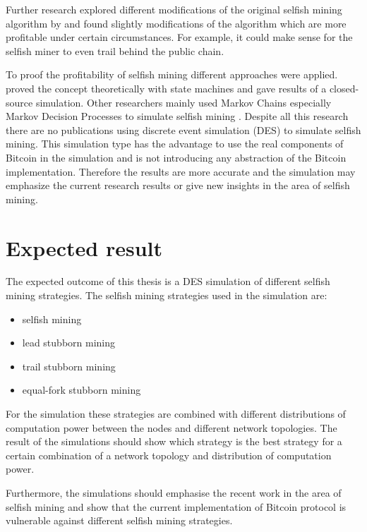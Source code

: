 \documentclass{scrartcl}
\begin{document}
Further research \cite{nayak2016stubborn,sapirshtein2016optimal} explored different modifications of the original selfish mining algorithm by \citeauthor{eyal2014majority} and found slightly modifications of the algorithm which are more profitable under certain circumstances. For example, it could make sense for the selfish miner to even trail behind the public chain.

To proof the profitability of selfish mining different approaches were applied. \citeauthor{eyal2014majority} proved the concept theoretically with state machines and gave results of a closed-source simulation. Other researchers mainly used Markov Chains especially Markov Decision Processes to simulate selfish mining \cite{nayak2016stubborn,sapirshtein2016optimal,gervais2016security}. Despite all this research there are no publications using discrete event simulation (DES) \cite{fishman1978principles} to simulate selfish mining. This simulation type has the advantage to use the real components of Bitcoin in the simulation and is not introducing any abstraction of the Bitcoin implementation. Therefore the results are more accurate and the simulation may emphasize the current research results or give new insights in the area of selfish mining.


\section{Expected result}
The expected outcome of this thesis is a DES simulation of different selfish mining strategies. The selfish mining strategies used in the simulation are:
\begin{itemize}
\item selfish mining \cite{eyal2014majority}
\item lead stubborn mining \cite{nayak2016stubborn}
\item trail stubborn mining \cite{nayak2016stubborn}
\item equal-fork stubborn mining \cite{nayak2016stubborn}
\end{itemize}

For the simulation these strategies are combined with different distributions of computation power between the nodes and different network topologies. The result of the simulations should show which strategy is the best strategy for a certain combination of a network topology and distribution of computation power. 

Furthermore, the simulations should emphasise the recent work in the area of selfish mining and show that the current implementation of Bitcoin protocol is vulnerable against different selfish mining strategies.
\end{document}
